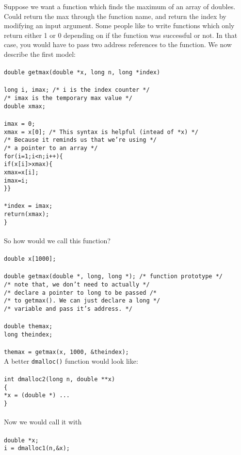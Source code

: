 \documentclass{article}
\begin{document}
Suppose we want a function which finds the maximum of an array of doubles.  Could return
the max through the function name, and return the index by modifying an input argument.
Some people like to write functions which only return either 1 or 0 depending on if the
function was successful or not.  In that case, you would have to pass two address 
references to the function.  We now describe the first model:\\\\
{\tt double getmax(double *x, long n, long *index)\\\\
long i, imax; /* i is the index counter */\\
\indent \indent/* imax is the temporary max value */\\
double xmax;\\\\
imax = 0;\\
xmax = x[0]; /* This syntax is helpful (intead of *x) */ \\
\indent \indent /* Because it reminds us that we're using */\\
\indent \indent /* a pointer to an array */ \\
for(i=1;i<n;i++)\{\\
if(x[i]>xmax)\{\\
xmax=x[i];\\
imax=i;\\
\}\}\\
\\
*index = imax;\\
return(xmax);\\
\}}\\
\\
So how would we call this function?\\
\\
{\tt double x[1000];\\
\\
double getmax(double *, long, long *); /* function prototype */\\
\indent /* note that, we don't need to actually */ \\
\indent /* declare a pointer to long to be passed /* \\
\indent /* to getmax().  We can just declare a long */ \\
\indent /* variable and pass it's address. */ \\
\\
double themax;\\
long theindex;\\\\
themax = getmax(x, 1000, \&theindex);}\\

A better {\tt dmalloc()} function would look like:\\
\\
{\tt int dmalloc2(long n, double **x)\\
\{\\
*x = (double *) ...\\
\}}\\
\\
Now we would call it with \\
\\
{\tt double *x;\\
i = dmalloc1(n,\&x);}
\end{document}
